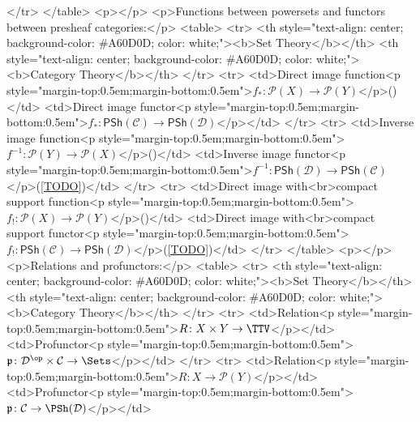   </tr>
</table>
<p></p>
<p>Functions between powersets and functors between presheaf categories:</p>
<table>
  <tr>
    <th style="text-align: center; background-color: #A60D0D; color: white;"><b>Set Theory</b></th>
    <th style="text-align: center; background-color: #A60D0D; color: white;"><b>Category Theory</b></th>
  </tr>
  <tr>
    <td>Direct image function<p style="margin-top:0.5em;margin-bottom:0.5em">$f_{*}\colon\mathcal{P}(X)\to\mathcal{P}(Y)$</p>()</td>
    <td>Direct image functor<p style="margin-top:0.5em;margin-bottom:0.5em">$f_{*}\colon\mathsf{PSh}(\mathcal{C})\to\mathsf{PSh}(\mathcal{D})$</p></td>
  </tr>
  <tr>
    <td>Inverse image function<p style="margin-top:0.5em;margin-bottom:0.5em">$f^{-1}\colon\mathcal{P}(Y)\to\mathcal{P}(X)$</p>()</td>
    <td>Inverse image functor<p style="margin-top:0.5em;margin-bottom:0.5em">$f^{-1}\colon\mathsf{PSh}(\mathcal{D})\to\mathsf{PSh}(\mathcal{C})$</p>(\cref{TODO})</td>
  </tr>
  <tr>
    <td>Direct image with<br>compact support function<p style="margin-top:0.5em;margin-bottom:0.5em">$f_{!}\colon\mathcal{P}(X)\to\mathcal{P}(Y)$</p>()</td>
    <td>Direct image with<br>compact support functor<p style="margin-top:0.5em;margin-bottom:0.5em">$f_{!}\colon\mathsf{PSh}(\mathcal{C})\to\mathsf{PSh}(\mathcal{D})$</p>(\cref{TODO})</td>
  </tr>
</table>
<p></p>
<p>Relations and profunctors:</p>
<table>
  <tr>
    <th style="text-align: center; background-color: #A60D0D; color: white;"><b>Set Theory</b></th>
    <th style="text-align: center; background-color: #A60D0D; color: white;"><b>Category Theory</b></th>
  </tr>
  <tr>
    <td>Relation<p style="margin-top:0.5em;margin-bottom:0.5em">$R\colon X\times Y\to\TTV$</p></td>
    <td>Profunctor<p style="margin-top:0.5em;margin-bottom:0.5em">$\mathfrak{p}\colon\mathcal{D}^{\op}\times\mathcal{C}\to\Sets$</p></td>
  </tr>
  <tr>
    <td>Relation<p style="margin-top:0.5em;margin-bottom:0.5em">$R\colon X\to\mathcal{P}(Y)$</p></td>
    <td>Profunctor<p style="margin-top:0.5em;margin-bottom:0.5em">$\mathfrak{p}\colon\mathcal{C}\to\PSh(\mathcal{D})$</p></td>
